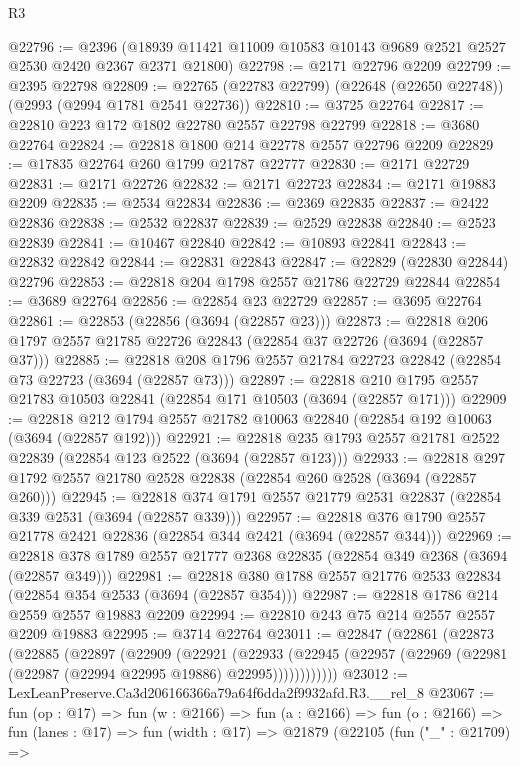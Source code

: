\begin{lexlean}{R3}
\begin{coremodule}
@22796 := @2396
    (@18939 @11421 @11009 @10583 @10143 @9689 @2521 @2527 @2530 @2420 @2367 @2371 @21800)
@22798 := @2171 @22796 @2209
@22799 := @2395 @22798
@22809 := @22765 (@22783 @22799) (@22648 (@22650 @22748)) (@2993 (@2994 @1781 @2541 @22736))
@22810 := @3725 @22764
@22817 := @22810 @223 @172 @1802 @22780 @2557 @22798 @22799
@22818 := @3680 @22764
@22824 := @22818 @1800 @214 @22778 @2557 @22796 @2209
@22829 := @17835 @22764 @260 @1799 @21787 @22777
@22830 := @2171 @22729
@22831 := @2171 @22726
@22832 := @2171 @22723
@22834 := @2171 @19883 @2209
@22835 := @2534 @22834
@22836 := @2369 @22835
@22837 := @2422 @22836
@22838 := @2532 @22837
@22839 := @2529 @22838
@22840 := @2523 @22839
@22841 := @10467 @22840
@22842 := @10893 @22841
@22843 := @22832 @22842
@22844 := @22831 @22843
@22847 := @22829 (@22830 @22844) @22796
@22853 := @22818 @204 @1798 @2557 @21786 @22729 @22844
@22854 := @3689 @22764
@22856 := @22854 @23 @22729
@22857 := @3695 @22764
@22861 := @22853 (@22856 (@3694 (@22857 @23)))
@22873 := @22818 @206 @1797 @2557 @21785 @22726 @22843 (@22854 @37 @22726 (@3694 (@22857 @37)))
@22885 := @22818 @208 @1796 @2557 @21784 @22723 @22842 (@22854 @73 @22723 (@3694 (@22857 @73)))
@22897 := @22818 @210 @1795 @2557 @21783 @10503 @22841 (@22854 @171 @10503 (@3694 (@22857 @171)))
@22909 := @22818 @212 @1794 @2557 @21782 @10063 @22840 (@22854 @192 @10063 (@3694 (@22857 @192)))
@22921 := @22818 @235 @1793 @2557 @21781 @2522 @22839 (@22854 @123 @2522 (@3694 (@22857 @123)))
@22933 := @22818 @297 @1792 @2557 @21780 @2528 @22838 (@22854 @260 @2528 (@3694 (@22857 @260)))
@22945 := @22818 @374 @1791 @2557 @21779 @2531 @22837 (@22854 @339 @2531 (@3694 (@22857 @339)))
@22957 := @22818 @376 @1790 @2557 @21778 @2421 @22836 (@22854 @344 @2421 (@3694 (@22857 @344)))
@22969 := @22818 @378 @1789 @2557 @21777 @2368 @22835 (@22854 @349 @2368 (@3694 (@22857 @349)))
@22981 := @22818 @380 @1788 @2557 @21776 @2533 @22834 (@22854 @354 @2533 (@3694 (@22857 @354)))
@22987 := @22818 @1786 @214 @2559 @2557 @19883 @2209
@22994 := @22810 @243 @75 @214 @2557 @2557 @2209 @19883
@22995 := @3714 @22764
@23011 := @22847
    (@22861
      (@22873
        (@22885
          (@22897
            (@22909
              (@22921
                (@22933
                  (@22945 (@22957 (@22969 (@22981 (@22987 (@22994 @22995 @19886) @22995))))))))))))
@23012 := LexLeanPreserve.Ca3d206166366a79a64f6dda2f9932afd.R3.__rel_8
@23067 := fun (op : @17) =>
  fun (w : @2166) =>
  fun (a : @2166) =>
  fun (o : @2166) =>
  fun (lanes : @17) =>
  fun (width : @17) =>
  @21879
    (@22105
      (fun ("_" : @21709) =>

\end{coremodule}
\end{lexlean}

